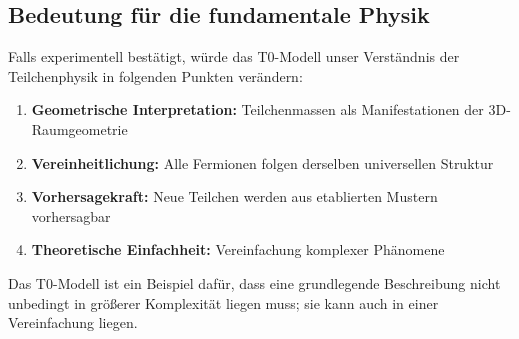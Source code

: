	\subsection{Bedeutung für die fundamentale Physik}
	\label{subsec:bedeutung_physik}
	
	Falls experimentell bestätigt, würde das T0-Modell unser Verständnis der Teilchenphysik in folgenden Punkten verändern:
	
	\begin{enumerate}
		\item \textbf{Geometrische Interpretation:} Teilchenmassen als Manifestationen der 3D-Raumgeometrie
		\item \textbf{Vereinheitlichung:} Alle Fermionen folgen derselben universellen Struktur
		\item \textbf{Vorhersagekraft:} Neue Teilchen werden aus etablierten Mustern vorhersagbar
		\item \textbf{Theoretische Einfachheit:} Vereinfachung komplexer Phänomene
	\end{enumerate}
	
	Das T0-Modell ist ein Beispiel dafür, dass eine grundlegende Beschreibung nicht unbedingt in größerer Komplexität liegen muss; sie kann auch in einer Vereinfachung liegen.
	

